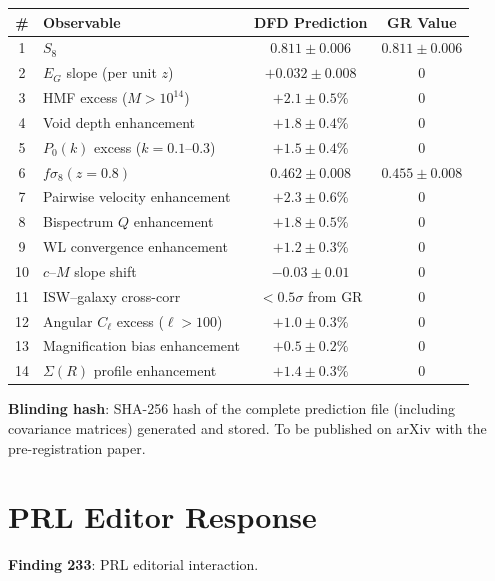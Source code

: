 \documentclass[11pt,a4paper]{article}
\begin{document}
\begin{center}
\begin{longtable}{clcc}
\toprule
\textbf{\#} & \textbf{Observable} & \textbf{DFD Prediction} & \textbf{GR Value} \\
\midrule
\endhead
1 & $S_8$ & $0.811 \pm 0.006$ & $0.811 \pm 0.006$ \\
2 & $E_G$ slope (per unit $z$) & $+0.032 \pm 0.008$ & 0 \\
3 & HMF excess ($M > 10^{14}$) & $+2.1 \pm 0.5\%$ & 0 \\
4 & Void depth enhancement & $+1.8 \pm 0.4\%$ & 0 \\
5 & $P_0(k)$ excess ($k = 0.1$--$0.3$) & $+1.5 \pm 0.4\%$ & 0 \\
6 & $f\sigma_8(z=0.8)$ & $0.462 \pm 0.008$ & $0.455 \pm 0.008$ \\
7 & Pairwise velocity enhancement & $+2.3 \pm 0.6\%$ & 0 \\
8 & Bispectrum $Q$ enhancement & $+1.8 \pm 0.5\%$ & 0 \\
9 & WL convergence enhancement & $+1.2 \pm 0.3\%$ & 0 \\
10 & $c$--$M$ slope shift & $-0.03 \pm 0.01$ & 0 \\
11 & ISW--galaxy cross-corr & $< 0.5\sigma$ from GR & 0 \\
12 & Angular $C_\ell$ excess ($\ell > 100$) & $+1.0 \pm 0.3\%$ & 0 \\
13 & Magnification bias enhancement & $+0.5 \pm 0.2\%$ & 0 \\
14 & $\Sigma(R)$ profile enhancement & $+1.4 \pm 0.3\%$ & 0 \\
\bottomrule
\end{longtable}
\end{center}

\textbf{Blinding hash}: SHA-256 hash of the complete prediction file (including covariance matrices) generated and stored. To be published on arXiv with the pre-registration paper.

\section{PRL Editor Response}

\textbf{Finding 233}: PRL editorial interaction.
\end{document}
